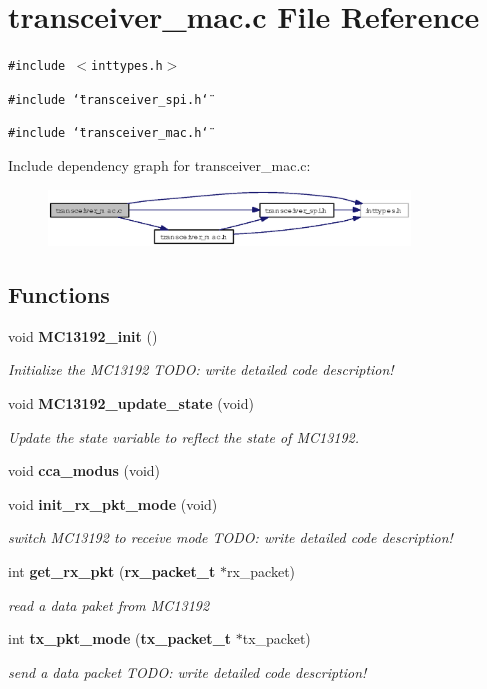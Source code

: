 \section{transceiver\_\-mac.c File Reference}
\label{transceiver__mac_8c}
{\tt \#include $<$inttypes.h$>$}\par
{\tt \#include \char`\"{}transceiver\_\-spi.h\char`\"{}}\par
{\tt \#include \char`\"{}transceiver\_\-mac.h\char`\"{}}\par


Include dependency graph for transceiver\_\-mac.c:\begin{figure}[H]
\begin{center}
\leavevmode
\includegraphics[width=272pt]{transceiver__mac_8c__incl}
\end{center}
\end{figure}
\subsection*{Functions}
\begin{CompactItemize}
\item 
void {\bf MC13192\_\-init} ()
\begin{CompactList}\small\item\em Initialize the MC13192 TODO: write detailed code description! \item\end{CompactList}\item 
void {\bf MC13192\_\-update\_\-state} (void)
\begin{CompactList}\small\item\em Update the state variable to reflect the state of MC13192. \item\end{CompactList}\item 
void {\bf cca\_\-modus} (void)
\item 
void {\bf init\_\-rx\_\-pkt\_\-mode} (void)
\begin{CompactList}\small\item\em switch MC13192 to receive mode TODO: write detailed code description! \item\end{CompactList}\item 
int {\bf get\_\-rx\_\-pkt} ({\bf rx\_\-packet\_\-t} $\ast$rx\_\-packet)
\begin{CompactList}\small\item\em read a data paket from MC13192 \item\end{CompactList}\item 
int {\bf tx\_\-pkt\_\-mode} ({\bf tx\_\-packet\_\-t} $\ast$tx\_\-packet)
\begin{CompactList}\small\item\em send a data packet TODO: write detailed code description! \item\end{CompactList}\end{CompactItemize}
